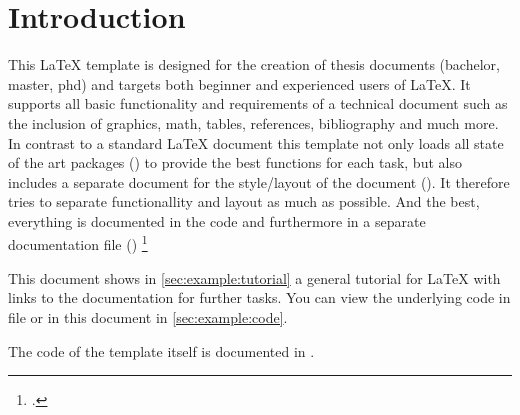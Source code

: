 
\chapter{Introduction}

This \LaTeX{} template is designed for the creation of thesis documents (bachelor, master, phd) and targets both beginner and experienced users of \LaTeX{}. It supports all basic functionality and requirements of a technical document such as the inclusion of graphics, math, tables, references, bibliography and much more. In contrast to a standard LaTeX document this template not only loads all state of the art packages () to provide the best functions for each task, but also includes a separate document for the style/layout of the document (). It therefore tries to separate functionallity and layout as much as possible. And the best, everything is documented in the code and furthermore in a separate documentation file () \footcite{companion}

This document shows in \cref{sec:example:tutorial} a general tutorial for \LaTeX{} with links to the documentation for further tasks. You can view the underlying code in file  or in this document in \cref{sec:example:code}.

The code of the template itself is documented in .